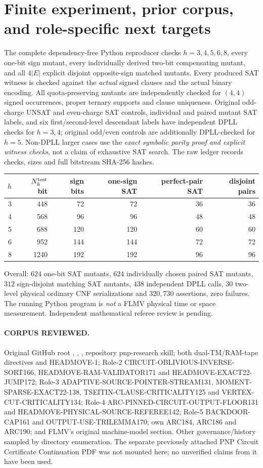 \documentclass[11pt]{article}
\begin{document}
\section{Finite experiment, prior corpus, and role-specific next targets}
The complete dependency-free Python reproducer checks $h=3,4,5,6,8$, every one-bit sign mutant, every individually derived two-bit compensating mutant, and all $4|E|$ explicit disjoint opposite-sign matched mutants. Every produced SAT witness is checked against the \emph{actual} signed clauses and the actual binary encoding. All quota-preserving mutants are independently checked for $(4,4)$ signed occurrences, proper ternary supports and clause uniqueness. Original odd-charge UNSAT and even-charge SAT controls, individual and paired mutant SAT labels, and six first/second-level descendant labels have independent DPLL checks for $h=3,4$; original odd/even controls are additionally DPLL-checked for $h=5$. Non-DPLL larger cases use the \emph{exact symbolic parity proof and explicit witness checks}, not a claim of exhaustive SAT search. The raw ledger records checks, sizes and full bitstream SHA-256 hashes.
\begin{center}\small
\begin{tabular}{rrrrrr}\toprule
$h$ & $N_h^{\rm test}$ bit & sign bits & one-sign SAT & perfect-pair SAT & disjoint pairs\\\midrule
3&448&72&72&36&36\\
4&568&96&96&48&48\\
5&688&120&120&60&60\\
6&952&144&144&72&72\\
8&1240&192&192&96&96\\\bottomrule
\end{tabular}
\end{center}
Overall: $624$ one-bit SAT mutants, $624$ individually chosen paired SAT mutants, $312$ sign-disjoint matching SAT mutants, $438$ independent DPLL calls, $30$ two-level physical ordinary CNF serializations and $320{,}730$ assertions, zero failures. The running Python program is \emph{not} a FLMV physical time or space measurement. Independent mathematical referee review is pending.

\paragraph{CORPUS REVIEWED.} Original GitHub root , , , repository pnp-research skill; both dual-TM/RAM-tape directives and HEADMOVE-1; Role-2 CIRCUIT-OBLIVIOUS-INVERSE-SORT166, HEADMOVE-RAM-VALIDATOR171 and HEADMOVE-EXACT22-JUMP172; Role-3 ADAPTIVE-SOURCE-POINTER-STREAM131, MOMENT-SPARSE-EXACT22-138, TSEITIN-CLAUSE-CRITICALITY125 and VERTEX-CUT-CRITICALITY134; Role-4 ARC-PINNED-CIRCUIT-OUTPUT-FLOOR131 and HEADMOVE-PHYSICAL-SOURCE-REFEREE142; Role-5 BACKDOOR-CAP161 and OUTPUT-USE-TRILEMMA170; own ARC184, ARC186 and ARC190; and FLMV's original machine-model section. Other governance/history sampled by directory enumeration. The separate previously attached PNP Circuit Certificate Continuation PDF was not mounted here; no unverified claims from it have been used.
\end{document}
